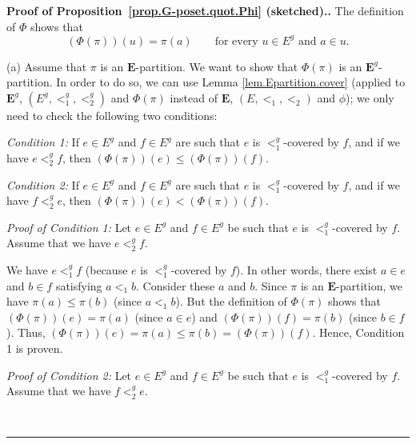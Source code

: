 \documentclass[numbers=enddot,12pt,final,onecolumn,notitlepage,abstracton]{scrartcl}%
\theoremstyle{definition}
\newenvironment{proof}[1][Proof]{\noindent\textbf{#1.} }{\ \rule{0.5em}{0.5em}}
\newcommand{\EE}{{\mathbf{E}}}
\begin{document}
\begin{proof}[Proof of Proposition~\ref{prop.G-poset.quot.Phi} (sketched).]
The definition of $\Phi$ shows that
\begin{equation}
\left(\Phi\left(\pi\right)\right) \left( u \right)
= \pi\left( a \right)
\qquad\text{for every } u \in E^{g} \text{ and } a \in u.
\label{pf.prop.G-poset.quot.phi.main}
\end{equation}

(a) Assume that $\pi$ is an $\EE$-partition. We
want to show that $\Phi\left(  \pi\right)  $ is an
$ \EE ^{g}$-partition. In order to do so, we can
use Lemma \ref{lem.Epartition.cover}
(applied to $\EE^{g}$, $\left(  E^{g},<_{1}^{g},<_{2}^{g}\right)  $ and
$\Phi\left(  \pi\right)  $ instead of $\EE$,
$\left(  E,<_{1},<_{2}\right)  $ and $\phi$); we only need to
check the following two conditions:

\textit{Condition 1:} If $e\in E^{g}$ and $f\in E^{g}$ are such that $e$ is
$<_{1}^{g}$-covered by $f$, and if we have $e<_{2}^{g}f$, then $\left(
\Phi\left(  \pi\right)  \right)  \left(  e\right)  \leq\left(  \Phi\left(
\pi\right)  \right)  \left(  f\right)  $.

\textit{Condition 2:} If $e\in E^{g}$ and $f\in E^{g}$ are such that $e$ is
$<_{1}^{g}$-covered by $f$, and if we have $f<_{2}^{g}e$, then $\left(
\Phi\left(  \pi\right)  \right)  \left(  e\right)  <\left(  \Phi\left(
\pi\right)  \right)  \left(  f\right)  $.

\textit{Proof of Condition 1:} Let $e\in E^{g}$ and $f\in E^{g}$ be such that
$e$ is $<_{1}^{g}$-covered by $f$. Assume that we have $e<_{2}^{g}f$.

We have $e<_{1}^{g}f$ (because $e$ is $<_{1}^{g}$-covered by $f$). In other
words, there exist $a\in e$ and $b\in f$ satisfying $a<_{1}b$. Consider these
$a$ and $b$. Since $\pi$ is an $\EE$-partition, we have $\pi\left(
a\right)  \leq\pi\left(  b\right)  $ (since $a<_{1}b$). But the definition of
$\Phi\left(  \pi\right)  $ shows that $\left(  \Phi\left(  \pi\right)
\right)  \left(  e\right)  =\pi\left(  a\right)  $ (since $a\in e$) and
$\left(  \Phi\left(  \pi\right)  \right)  \left(  f\right)  =\pi\left(
b\right)  $ (since $b\in f$). Thus, $\left(  \Phi\left(  \pi\right)  \right)
\left(  e\right)  =\pi\left(  a\right)  \leq\pi\left(  b\right)  =\left(
\Phi\left(  \pi\right)  \right)  \left(  f\right)  $. Hence, Condition 1 is proven.

\textit{Proof of Condition 2:} Let $e\in E^{g}$ and $f\in E^{g}$ be such that
$e$ is $<_{1}^{g}$-covered by $f$. Assume that we have $f<_{2}^{g}e$.


\end{proof}
\end{document}
